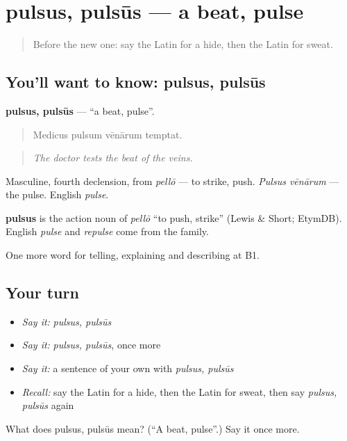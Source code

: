 \section[pulsus, pulsūs]{pulsus, pulsūs — a beat, pulse}

\label{lesson:LA-C517-pulsus}



\begin{quote}
Before the new one: say the Latin for a hide, then the Latin for sweat.
\end{quote}

\subsection*{You'll want to know: pulsus, pulsūs}
\textbf{pulsus, pulsūs} — \textquotedblleft{}a beat, pulse\textquotedblright{}.

\begin{quote}
Medicus pulsum vēnārum temptat.
\end{quote}

\begin{quote}
\emph{The doctor tests the beat of the veins.}
\end{quote}

Masculine, fourth declension, from \emph{pellō} — to strike, push. \emph{Pulsus vēnārum} — the pulse. English \emph{pulse}.

\begin{cousinweb}
\textbf{pulsus} is the action noun of \emph{pellō} \textquotedblleft{}to push, strike\textquotedblright{} (Lewis \& Short; EtymDB). English \emph{pulse} and \emph{repulse} come from the family.
\end{cousinweb}

\begin{grammarlens}[title={What you've built}]
One more word for telling, explaining and describing at B1.
\end{grammarlens}

\subsection*{Your turn}
\begin{itemize}
\raggedright
  \item \emph{Say it:} \emph{pulsus, pulsūs}
  \item \emph{Say it:} \emph{pulsus, pulsūs}, once more
  \item \emph{Say it:} a sentence of your own with \emph{pulsus, pulsūs}
  \item \emph{Recall:} say the Latin for a hide, then the Latin for sweat, then say \emph{pulsus, pulsūs} again
\end{itemize}

\begin{tcolorbox}[breakable,colback=teal!4,colframe=teal!35!black,title={Before you move on}]
What does pulsus, pulsūs mean? (\textquotedblleft{}A beat, pulse\textquotedblright{}.) Say it once more.
\end{tcolorbox}
